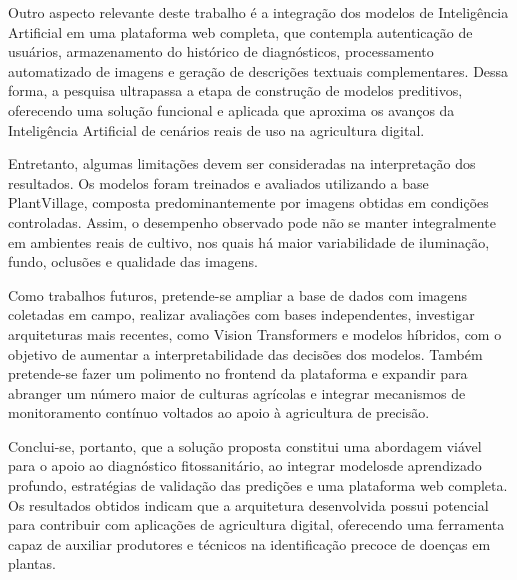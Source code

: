 \documentclass[portuguese]{sbc2025}%
\begin{document}
Outro aspecto relevante deste trabalho é a integração dos modelos de Inteligência Artificial em uma plataforma web completa, que 
contempla autenticação de usuários, armazenamento do histórico de diagnósticos, processamento automatizado de imagens e geração de 
descrições textuais complementares. Dessa forma, a pesquisa ultrapassa a etapa de construção de modelos preditivos, oferecendo uma 
solução funcional e aplicada que aproxima os avanços da Inteligência Artificial de cenários reais de uso na agricultura digital.

Entretanto, algumas limitações devem ser consideradas na interpretação dos resultados. Os modelos foram treinados e avaliados 
utilizando a base PlantVillage, composta predominantemente por imagens obtidas em condições controladas. Assim, o desempenho 
observado pode não se manter integralmente em ambientes reais de cultivo, nos quais há maior variabilidade de iluminação, fundo, 
oclusões e qualidade das imagens.

Como trabalhos futuros, pretende-se ampliar a base de dados com imagens coletadas em campo, realizar avaliações com bases independentes, 
investigar arquiteturas mais recentes, como Vision Transformers e modelos híbridos, com o objetivo de aumentar a interpretabilidade 
das decisões dos modelos. Também pretende-se fazer um polimento no frontend da plataforma e expandir para abranger um número maior 
de culturas agrícolas e integrar mecanismos de monitoramento contínuo voltados ao apoio à agricultura de precisão.

Conclui-se, portanto, que a solução proposta constitui uma abordagem viável para o apoio ao diagnóstico fitossanitário, ao integrar 
modelosde aprendizado profundo, estratégias de validação das predições e uma plataforma web completa. Os resultados obtidos indicam 
que a arquitetura desenvolvida possui potencial para contribuir com aplicações de agricultura digital, oferecendo uma ferramenta capaz 
de auxiliar produtores e técnicos na identificação precoce de doenças em plantas.
\end{document}
